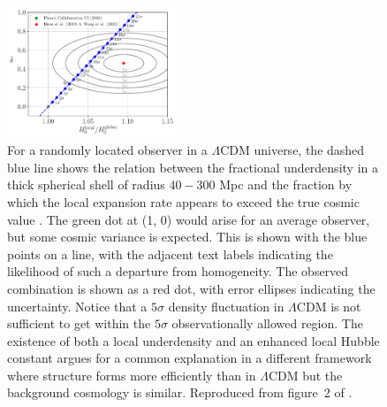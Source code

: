 \documentclass[fleqn,usenatbib,useAMS,onecolumn]{mnras} %
\begin{document}
\begin{figure}
	\centering
	\includegraphics[width=0.45\textwidth]{Haslbauer_2020_Figure_2}
	\caption{For a randomly located observer in a $\Lambda$CDM universe, the dashed blue line shows the relation between the fractional underdensity in a thick spherical shell of radius $40-300$ Mpc and the fraction by which the local expansion rate appears to exceed the true cosmic value \citep{Planck_2020}. The green dot at (1, 0) would arise for an average observer, but some cosmic variance is expected. This is shown with the blue points on a line, with the adjacent text labels indicating the likelihood of such a departure from homogeneity. The observed combination is shown as a red dot, with error ellipses indicating the uncertainty. Notice that a $5\sigma$ density fluctuation in $\Lambda$CDM is not sufficient to get within the $5\sigma$ observationally allowed region. The existence of both a local underdensity and an enhanced local Hubble constant \citep{Riess_2019, Wong_2020} argues for a common explanation in a different framework where structure forms more efficiently than in $\Lambda$CDM but the background cosmology is similar. Reproduced from figure~2 of \citet{Haslbauer_2020}.}
	\label{Haslbauer_2020_Figure_2}
\end{figure}
\end{document}
